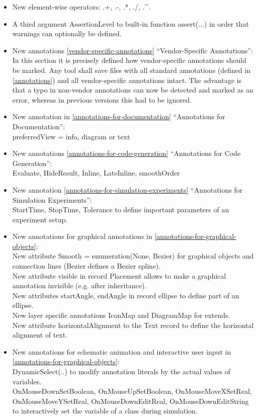\documentclass[10pt,a4paper]{report}
\begin{document}
\begin{itemize}
\item
  New element-wise operators: .+, .-, .*, ./, .\^{}.
\item
  A third argument AssertionLevel to built-in function assert(...) in
  order that warnings can optionally be defined.
\item
  New annotations \ref{vendor-specific-annotations} ``Vendor-Specific Annotations'':\\
  In this section it is precisely defined how vendor-specific
  annotations should be marked. Any tool shall save files with all
  standard annotations (defined in \ref{annotations}) and all vendor-specific
  annotations intact. The advantage is that a typo in non-vendor
  annotations can now be detected and marked as an error, whereas in
  previous versions this had to be ignored.
\item
  New annotation in \ref{annotations-for-documentation} ``Annotations for Documentation'':\\
  preferredView = info, diagram or text
\item
  New annotations \ref{annotations-for-code-generation} ``Annotations for Code Generation'':\\
  Evaluate, HideResult, Inline, LateInline, smoothOrder
\item
  New annotation \ref{annotations-for-simulation-experiments} ``Annotations for Simulation
  Experiments'':\\
  StartTime, StopTime, Tolerance to define important parameters of an
  experiment setup.
\item
  New annotations for graphical annotations in \ref{annotations-for-graphical-objects}:\\
  New attribute Smooth = enumeration(None, Bezier) for graphical objects
  and connection lines (Bezier defines a Bezier spline).\\
  New attribute visible in record Placement allows to make a graphical
  annotation invisible (e.g. after inheritance).\\
  New attributes startAngle, endAngle in record ellipse to define part
  of an ellipse.\\
  New layer specific annotations IconMap and DiagramMap for extends.\\
  New attribute horizontalAlignment to the Text record to define the
  horizontal alignment of text.
\item
  New annotations for schematic animation and interactive user input in
  \ref{annotations-for-graphical-objects}:\\
  DynamicSelect(..) to modify annotation literals by the actual values
  of variables.\\
  OnMouseDownSetBoolean, OnMouseUpSetBoolean, OnMouseMoveXSetReal,
  OnMouseMoveYSetReal, OnMouseDownEditReal, OnMouseDownEditString to
  interactively set the variable of a class during simulation.
\end{itemize}
\end{document}
